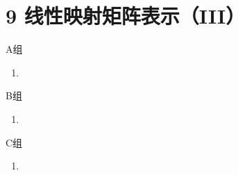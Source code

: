 \section*{9 线性映射矩阵表示（III）}

\vspace{2ex}

\centerline{\heiti A组}
\begin{enumerate}
    \item
\end{enumerate}

\centerline{\heiti B组}
\begin{enumerate}
    \item
\end{enumerate}

\centerline{\heiti C组}
\begin{enumerate}
    \item
\end{enumerate}

\clearpage
